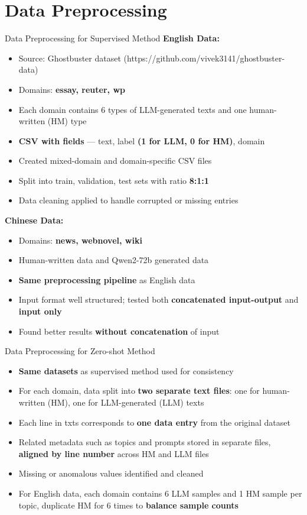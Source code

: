 \documentclass[serif]{beamer}
\begin{document}
\section{Data Preprocessing}
\begin{frame}{Data Preprocessing for Supervised Method}
\textbf{English Data:}
\begin{itemize}
  \item Source:  {\footnotesize Ghostbuster dataset (https://github.com/vivek3141/ghostbuster-data)}
  \item Domains: \textbf{essay, reuter, wp}
  \item Each domain contains 6 types of LLM-generated texts and one human-written (HM) type
  \item \textbf{CSV with fields} — text, label {\footnotesize \textbf{(1 for LLM, 0 for HM)}}, domain
  \item Created mixed-domain and domain-specific CSV files
  \item Split into train, validation, test sets with ratio \textbf{8:1:1}
  \item Data cleaning applied to handle corrupted or missing entries
\end{itemize}

\textbf{Chinese Data:}
\begin{itemize}
  \item Domains: \textbf{news, webnovel, wiki}
  \item Human-written data and Qwen2-72b generated data
  \item \textbf{Same preprocessing pipeline} as English data
  \item Input format well structured; tested both \textbf{concatenated input-output} and \textbf{input only}
  \item Found better results \textbf{without concatenation} of input 
\end{itemize}
\end{frame}

\begin{frame}{Data Preprocessing for Zero-shot Method}
\begin{itemize}
  \item \textbf{Same datasets} as supervised method used for consistency
  \item For each domain, data split into \textbf{two separate text files}: one for human-written (HM), one for LLM-generated (LLM) texts
  \item Each line in txts corresponds to \textbf{one data entry} from the original dataset
  \item Related metadata such as topics and prompts stored in separate files, \textbf{aligned by line number} across HM and LLM files
  \item Missing or anomalous values identified and cleaned 
  \item For English data, each domain contains 6 LLM samples and 1 HM sample per topic, duplicate HM for 6 times to \textbf{balance sample counts}
\end{itemize}
\end{frame}
\end{document}
